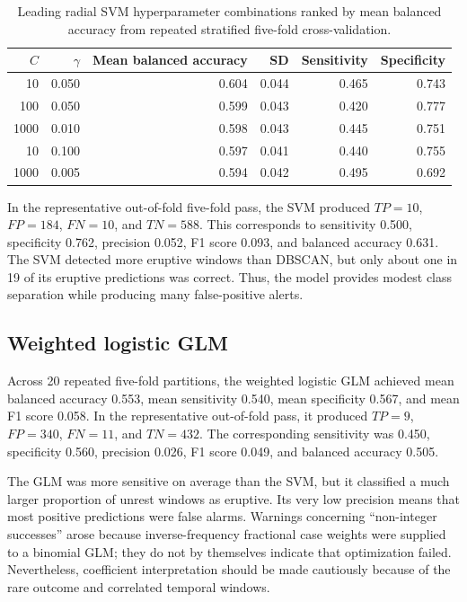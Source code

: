 \documentclass[11pt]{article}
\begin{document}
\begin{table}[H]
	\centering
	\caption{Leading radial SVM hyperparameter combinations ranked by mean
		balanced accuracy from repeated stratified five-fold cross-validation.}
	\label{tab:svm-grid}
	\small
	\begin{tabular}{rrrrrr}
		\toprule
		$C$ & $\gamma$ & Mean balanced accuracy & SD & Sensitivity & Specificity \\
		\midrule
		10   & 0.050 & 0.604 & 0.044 & 0.465 & 0.743 \\
		100  & 0.050 & 0.599 & 0.043 & 0.420 & 0.777 \\
		1000 & 0.010 & 0.598 & 0.043 & 0.445 & 0.751 \\
		10   & 0.100 & 0.597 & 0.041 & 0.440 & 0.755 \\
		1000 & 0.005 & 0.594 & 0.042 & 0.495 & 0.692 \\
		\bottomrule
	\end{tabular}
\end{table}

In the representative out-of-fold five-fold pass, the SVM produced $TP=10$, $FP=184$, $FN=10$, and $TN=588$. This corresponds to sensitivity 0.500, specificity 0.762, precision 0.052, F1 score 0.093, and balanced accuracy 0.631. The SVM detected more eruptive windows than DBSCAN, but only about one in 19 of its eruptive predictions was correct. Thus, the model provides modest class separation while producing many false-positive alerts.

\subsection{Weighted logistic GLM}

Across 20 repeated five-fold partitions, the weighted logistic GLM achieved mean balanced accuracy 0.553, mean sensitivity 0.540, mean specificity 0.567, and mean F1 score 0.058. In the representative out-of-fold pass, it produced $TP=9$, $FP=340$, $FN=11$, and $TN=432$. The corresponding sensitivity was 0.450, specificity 0.560, precision 0.026, F1 score 0.049, and balanced accuracy 0.505.

The GLM was more sensitive on average than the SVM, but it classified a much larger proportion of unrest windows as eruptive. Its very low precision means that most positive predictions were false alarms. Warnings concerning ``non-integer successes'' arose because inverse-frequency fractional case weights were supplied to a binomial GLM; they do not by themselves indicate that optimization failed. Nevertheless, coefficient interpretation should be made cautiously because of the rare outcome and correlated temporal windows.
\end{document}
